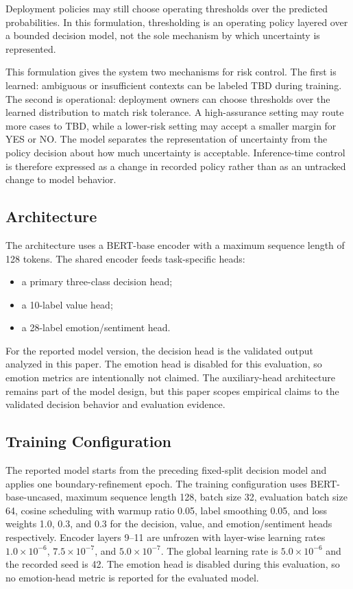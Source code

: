 \documentclass[11pt]{article}
\begin{document}
Deployment policies may still choose operating thresholds over the predicted probabilities. In this formulation, thresholding is an operating policy layered over a bounded decision model, not the sole mechanism by which uncertainty is represented.

This formulation gives the system two mechanisms for risk control. The first is learned: ambiguous or insufficient contexts can be labeled TBD during training. The second is operational: deployment owners can choose thresholds over the learned distribution to match risk tolerance. A high-assurance setting may route more cases to TBD, while a lower-risk setting may accept a smaller margin for YES or NO. The model separates the representation of uncertainty from the policy decision about how much uncertainty is acceptable. Inference-time control is therefore expressed as a change in recorded policy rather than as an untracked change to model behavior.

\subsection{Architecture}

The architecture uses a BERT-base encoder \cite{devlin2019bert} with a maximum sequence length of 128 tokens. The shared encoder feeds task-specific heads:
\begin{itemize}[leftmargin=1.5em]
  \item a primary three-class decision head;
  \item a 10-label value head;
  \item a 28-label emotion/sentiment head.
\end{itemize}

For the reported model version, the decision head is the validated output analyzed in this paper. The emotion head is disabled for this evaluation, so emotion metrics are intentionally not claimed. The auxiliary-head architecture remains part of the model design, but this paper scopes empirical claims to the validated decision behavior and evaluation evidence.

\subsection{Training Configuration}

The reported model starts from the preceding fixed-split decision model and applies one boundary-refinement epoch. The training configuration uses BERT-base-uncased, maximum sequence length 128, batch size 32, evaluation batch size 64, cosine scheduling with warmup ratio 0.05, label smoothing 0.05, and loss weights 1.0, 0.3, and 0.3 for the decision, value, and emotion/sentiment heads respectively. Encoder layers 9--11 are unfrozen with layer-wise learning rates $1.0{\times}10^{-6}$, $7.5{\times}10^{-7}$, and $5.0{\times}10^{-7}$. The global learning rate is $5.0{\times}10^{-6}$ and the recorded seed is 42. The emotion head is disabled during this evaluation, so no emotion-head metric is reported for the evaluated model.
\end{document}
